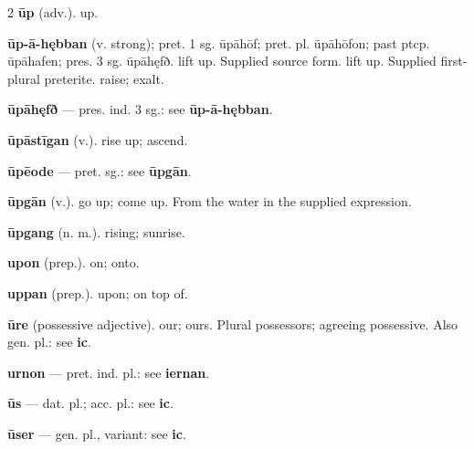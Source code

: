 \begin{multicols*}{2}
\textbf{ūp} (adv.). up.\par
\textbf{ūp-ā-hębban} (v. strong); pret. 1 sg. ūpāhōf; pret. pl. ūpāhōfon; past ptcp. ūpāhafen; pres. 3 sg. ūpāhęfð. lift up. Supplied source form. lift up. Supplied first-plural preterite. raise; exalt.\par
\textbf{ūpāhęfð} — pres. ind. 3 sg.: see \textbf{ūp-ā-hębban}.\par
\textbf{ūpāstīgan} (v.). rise up; ascend.\par
\textbf{ūpēode} — pret. sg.: see \textbf{ūpgān}.\par
\textbf{ūpgān} (v.). go up; come up. From the water in the supplied expression.\par
\textbf{ūpgang} (n. m.). rising; sunrise.\par
\textbf{upon} (prep.). on; onto.\par
\textbf{uppan} (prep.). upon; on top of.\par
\textbf{ūre} (possessive adjective). our; ours. Plural possessors; agreeing possessive. Also gen. pl.: see \textbf{ic}.\par
\textbf{urnon} — pret. ind. pl.: see \textbf{iernan}.\par
\textbf{ūs} — dat. pl.; acc. pl.: see \textbf{ic}.\par
\textbf{ūser} — gen. pl., variant: see \textbf{ic}.\par

\end{multicols*}

